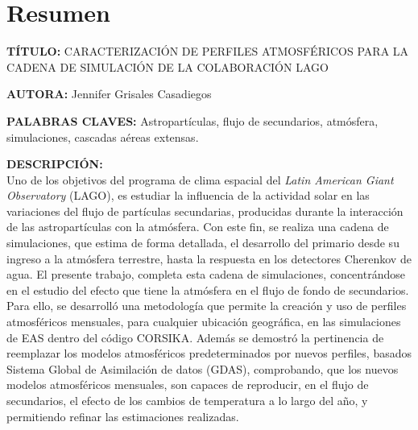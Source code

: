 \newpage
\chapter*{Resumen}
\label{sec:resum}
\footnotesize{
\noindent\textbf{TÍTULO:} CARACTERIZACIÓN DE PERFILES ATMOSFÉRICOS PARA LA CADENA DE SIMULACIÓN DE LA COLABORACIÓN LAGO

\noindent\textbf{AUTORA:} Jennifer Grisales Casadiegos

\noindent\textbf{PALABRAS CLAVES: } Astropartículas, flujo de secundarios, atmósfera, simulaciones, cascadas aéreas extensas.

\noindent \textbf{DESCRIPCIÓN: } \\
Uno de los objetivos del programa de clima espacial del \textit{Latin American Giant Observatory} (LAGO), es estudiar la influencia de la actividad solar en las variaciones del flujo de partículas secundarias, producidas durante la interacción de las astropartículas con la atmósfera. Con este fin, se realiza una cadena de simulaciones, que estima de forma detallada, el desarrollo del primario desde su ingreso a la atmósfera terrestre, hasta la respuesta en los detectores Cherenkov de agua. El presente trabajo, completa esta cadena de simulaciones, concentrándose en el estudio del efecto que tiene la atmósfera en el flujo de fondo de secundarios. Para ello, se desarrolló una metodología que permite la creación y uso de perfiles atmosféricos mensuales, para cualquier ubicación geográfica, en las simulaciones de EAS dentro del código CORSIKA. Además se demostró la pertinencia de reemplazar los modelos atmosféricos predeterminados por nuevos perfiles, basados Sistema Global de Asimilación de datos (GDAS), comprobando, que los nuevos modelos atmosféricos mensuales, son capaces de reproducir, en el flujo de secundarios, el efecto de los cambios de temperatura a lo largo del año, y permitiendo refinar las estimaciones realizadas.
}\normalsize
\clearpage